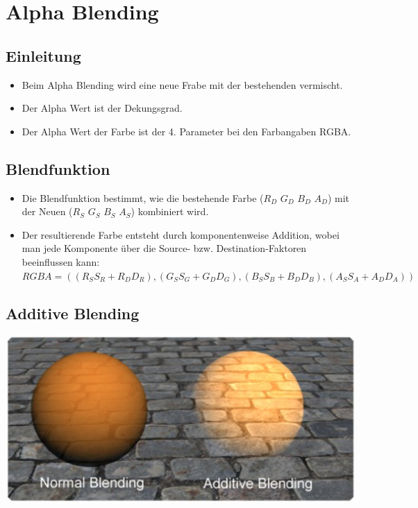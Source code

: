 \documentclass[10pt]{article}
\begin{document}
\newpage
\section{Alpha Blending}
\subsection{Einleitung}
\begin{itemize}
	\item Beim Alpha Blending wird eine neue Frabe mit der bestehenden vermischt.
	\item Der Alpha Wert ist der Dekungsgrad.
	\item Der Alpha Wert der Farbe ist der 4. Parameter bei den Farbangaben RGBA.
\end{itemize}
\subsection{Blendfunktion}
\begin{itemize}
	\item Die Blendfunktion bestimmt, wie die bestehende Farbe ($R_D$ $G_D$ $B_D$ $A_D$) mit der Neuen ($R_S$ $G_S$  $B_S$ $A_S$) kombiniert wird.
	\item Der resultierende Farbe entsteht durch komponentenweise Addition, wobei man jede Komponente über die Source- bzw. Destination-Faktoren beeinflussen kann: \\
	$RGBA = ((R_SS_R + R_DD_R), (G_SS_G + G_DD_G), (B_SS_B + B_DD_B), (A_SS_A + A_DD_A))$
\end{itemize}
\subsection{Additive Blending}
\begin{center}
	\includegraphics[scale=0.2]{additive_blending.png}
\end{center}
\end{document}
